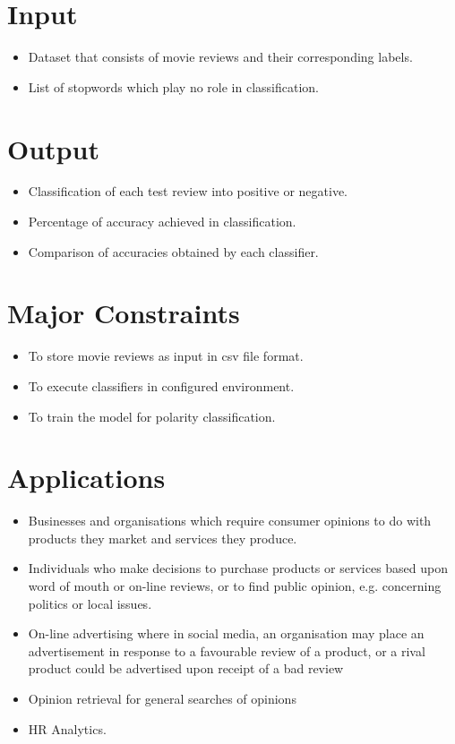 \documentclass[oneside,a4paper,12pt]{pictreport}
\begin{document}
\section{Input}
\begin{itemize}
\item Dataset that consists of movie reviews and their corresponding labels.
\item List of stopwords which play no role in classification.
\end{itemize}


\section{Output}
\begin{itemize}
\item Classification of each test review into positive or negative.
\item Percentage of accuracy achieved in classification.
\item Comparison of accuracies obtained by each classifier.
\end{itemize}

\section{Major Constraints}

\begin{itemize}
\item To store movie reviews as input in csv file format.
\item To execute classifiers in configured environment.
\item To train the model for polarity classification.
\end{itemize}

\section{Applications}
\begin{itemize}
\item Businesses and organisations which require consumer opinions to do with products they market and services they produce.
\item Individuals who make decisions to purchase products or services based upon word of mouth or on-line reviews, or to find public opinion, e.g. concerning politics or local issues.
\item On-line advertising where in social media, an organisation may place an advertisement in response to a favourable review of a product, or a rival product could be advertised upon receipt of a bad review
\item Opinion retrieval for general searches of opinions
\item HR Analytics.
\end{itemize}
\end{document}
